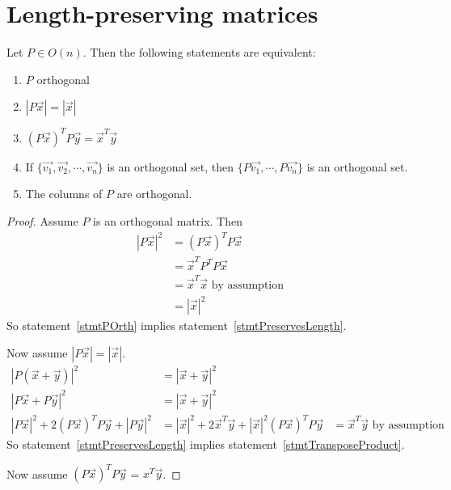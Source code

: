\documentclass[../Main.tex]{subfiles}
\begin{document}
\section{Length-preserving matrices}
\begin{theorem}
    Let $P \in O(n)$. Then the following statements are equivalent:
    \begin{enumerate}
        \item $P$ orthogonal \label{stmtPOrth}
        \item $|P\vec{x}| = |\vec{x}|$ \label{stmtPreservesLength}
        \item $(P\vec{x})^T P\vec{y} = \vec{x}^T \vec{y}$ \label{stmtTransposeProduct}
        \item If $\{\vec{v_1}, \vec{v_2}, \cdots, \vec{v_n}\}$ is an orthogonal set, then $\{P\vec{v_1}, \cdots, P\vec{v_n}\}$ is an orthogonal set. \label{stmtOrthogonalSet}
        \item The columns of $P$ are orthogonal. \label{stmtOrthogonalColumns}
    \end{enumerate}
\end{theorem}
\begin{proof}
    Assume $P$ is an orthogonal matrix. Then
    \begin{align*}
        |P\vec{x}|^2 &= (P\vec{x})^T P \vec{x} \\
        &= \vec{x}^T P^T P \vec{x} \\
        &= \vec{x}^T \vec{x} \text{ by assumption} \\
        &= |\vec{x}|^2
    \end{align*}
    So statement~\ref{stmtPOrth} implies statement~\ref{stmtPreservesLength}.\par
    Now assume $|P\vec{x}| = |\vec{x}|$.
    \begin{align*}
        |P(\vec{x} + \vec{y})|^2 &= |\vec{x} + \vec{y}|^2 \\
        |P\vec{x} + P\vec{y}|^2 &= |\vec{x} + \vec{y}|^2 \\
        |P\vec{x}|^2 + 2(P\vec{x})^T P\vec{y} + |P\vec{y}|^2 &= |\vec{x}|^2 + 2\vec{x}^T \vec{y} + |\vec{x}|^2
        (P\vec{x})^T P\vec{y} &= \vec{x}^T \vec{y} \text{ by assumption}
    \end{align*}
    So statement~\ref{stmtPreservesLength} implies statement~\ref{stmtTransposeProduct}.\par
    Now assume $(P\vec{x})^T P\vec{y}$ = $x^T \vec{y}$.\par

\end{proof}
\end{document}
